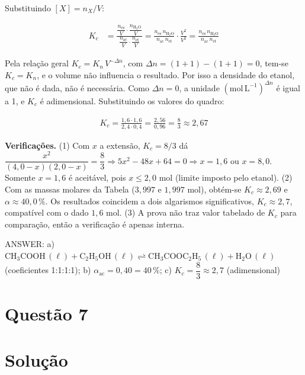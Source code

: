 \documentclass{article}%
\begin{document}
Substituindo $[X]=n_X/V$:

\begin{align*}
K_c &= \frac{\dfrac{n_{\mathrm{es}}}{V}\cdot\dfrac{n_{\mathrm{H_2O}}}{V}}{\dfrac{n_{\mathrm{ac}}}{V}\cdot\dfrac{n_{\mathrm{et}}}{V}} = \frac{n_{\mathrm{es}}\,n_{\mathrm{H_2O}}}{n_{\mathrm{ac}}\,n_{\mathrm{et}}}\cdot\frac{V^{2}}{V^{2}} = \frac{n_{\mathrm{es}}\,n_{\mathrm{H_2O}}}{n_{\mathrm{ac}}\,n_{\mathrm{et}}}
\end{align*}

Pela relação geral $K_c=K_n\,V^{-\Delta n}$, com $\Delta n=(1+1)-(1+1)=0$, tem-se $K_c=K_n$, e o volume não influencia o resultado. Por isso a densidade do etanol, que não é dada, não é necessária. Como $\Delta n=0$, a unidade $(\text{mol}\,\text{L}^{-1})^{\Delta n}$ é igual a 1, e $K_c$ é adimensional. Substituindo os valores do quadro:

\begin{align*}
K_c = \frac{1{,}6\cdot 1{,}6}{2{,}4\cdot 0{,}4} = \frac{2{,}56}{0{,}96} = \frac{8}{3} \approx 2{,}67
\end{align*}

\textbf{Verificações.} (1) Com $x$ a extensão, $K_c=8/3$ dá $\dfrac{x^2}{(4{,}0-x)(2{,}0-x)}=\dfrac{8}{3}\Rightarrow 5x^2-48x+64=0\Rightarrow x=1{,}6$ ou $x=8{,}0$. Somente $x=1{,}6$ é aceitável, pois $x\le 2{,}0$ mol (limite imposto pelo etanol). (2) Com as massas molares da Tabela ($3{,}997$ e $1{,}997$ mol), obtém-se $K_c\approx 2{,}69$ e $\alpha\approx 40{,}0\,\%$. Os resultados coincidem a dois algarismos significativos, $K_c\approx 2{,}7$, compatível com o dado $1{,}6$ mol. (3) A prova não traz valor tabelado de $K_c$ para comparação, então a verificação é apenas interna.

ANSWER: a) $\mathrm{CH_3COOH}\,(\ell) + \mathrm{C_2H_5OH}\,(\ell) \rightleftharpoons \mathrm{CH_3COOC_2H_5}\,(\ell) + \mathrm{H_2O}\,(\ell)$ (coeficientes 1:1:1:1); b) $\alpha_{\mathrm{ac}} = 0{,}40 = 40\,\%$; c) $K_c = \dfrac{8}{3} \approx 2{,}7$ (adimensional)%
\newpage%
\section*{Questão 7}

\section*{Solução}
\end{document}
